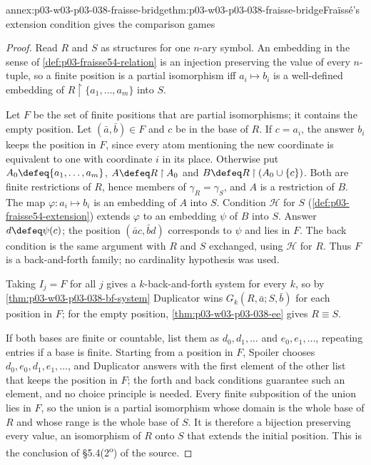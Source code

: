 \begin{annexitem}{annex:p03-w03-p03-038-fraisse-bridge}{thm:p03-w03-p03-038-fraisse-bridge}{Fra\"iss\'e's extension condition gives the comparison games}
\begin{proof}
Read \(R\) and \(S\) as structures for one \(n\)-ary symbol. An embedding in
the sense of \cref{def:p03-fraisse54-relation} is an injection preserving
the value of every \(n\)-tuple, so a finite position is a partial
isomorphism iff \(a_i\mapsto b_i\) is a well-defined embedding of
\(R\mathbin{\upharpoonright}\{a_1,\ldots,a_m\}\) into \(S\).

Let \(F\) be the set of finite positions that are partial isomorphisms; it
contains the empty position. Let \((\bar a,\bar b)\in F\) and \(c\) be in the
base of \(R\). If \(c=a_i\), the answer \(b_i\) keeps the position in \(F\),
since every atom mentioning the new coordinate is equivalent to one with
coordinate \(i\) in its place. Otherwise put \(A_0\defeq\{a_1,\ldots,a_m\}\),
\(A\defeq R\mathbin{\upharpoonright}A_0\) and
\(B\defeq R\mathbin{\upharpoonright}(A_0\cup\{c\})\). Both are finite
restrictions of \(R\), hence members of \(\gamma_R=\gamma_S\), and \(A\) is a
restriction of \(B\). The map \(\varphi:a_i\mapsto b_i\) is an embedding of
\(A\) into \(S\). Condition \(\mathcal H\) for \(S\)
(\cref{def:p03-fraisse54-extension}) extends \(\varphi\) to an embedding
\(\psi\) of \(B\) into \(S\). Answer \(d\defeq\psi(c)\); the position
\((\bar ac,\bar bd)\) corresponds to \(\psi\) and lies in \(F\). The back
condition is the same argument with \(R\) and \(S\) exchanged, using
\(\mathcal H\) for \(R\). Thus \(F\) is a back-and-forth family; no
cardinality hypothesis was used.

Taking \(I_j=F\) for all \(j\) gives a \(k\)-back-and-forth system for every
\(k\), so by \cref{thm:p03-w03-p03-038-bf-system} Duplicator wins
\(G_k(R,\bar a;S,\bar b)\) for each position in \(F\); for the empty
position, \cref{thm:p03-w03-p03-038-ee} gives \(R\equiv S\).

If both bases are finite or countable, list them as \(d_0,d_1,\ldots\) and
\(e_0,e_1,\ldots\), repeating entries if a base is finite. Starting from a
position in \(F\), Spoiler chooses \(d_0,e_0,d_1,e_1,\ldots\), and Duplicator
answers with the first element of the other list that keeps the position in
\(F\); the forth and back conditions guarantee such an element, and no
choice principle is needed. Every finite subposition of the union lies in
\(F\), so the union is a partial isomorphism whose domain is the whole base
of \(R\) and whose range is the whole base of \(S\). It is therefore a
bijection preserving every value, an isomorphism of \(R\) onto \(S\) that
extends the initial position. This is the conclusion of
\S5.4(2\textsuperscript{o}) of the source.
\end{proof}
\end{annexitem}


